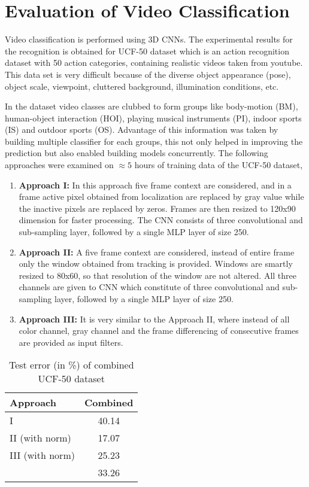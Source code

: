 \section{Evaluation of Video Classification} 
\label{sec:EvVS}
Video classification is performed using 3D CNNs.  The experimental results for the recognition is obtained for UCF-50 dataset which is an action recognition dataset with 50 action categories,	 containing realistic videos taken from youtube.  This data set is very difficult because of the diverse object appearance (pose), object scale, viewpoint, cluttered background, illumination conditions, etc.  
\par In the dataset video classes are clubbed to form groups like body-motion (BM), human-object interaction (HOI), playing musical instruments (PI), indoor sports (IS) and outdoor sports (OS).   Advantage of this information was taken by building multiple classifier for each groups, this not only helped in improving the prediction but also enabled building models concurrently. The following approaches were examined on $\approx{5}$ hours of training data of the UCF-50 dataset,
\begin{enumerate}
	\item{\textbf{Approach I:} In this approach five frame context are considered, and in a frame active pixel obtained from localization are replaced by gray value while the inactive pixels are replaced by zeros.  Frames are then resized to 120x90 dimension for faster processing.  The CNN consists of three convolutional and sub-sampling layer,  followed by a single MLP layer of size 250.}
	\item{\textbf{Approach II:} A five frame context are considered, instead of entire frame only the window obtained from tracking is provided.  Windows are smartly resized to 80x60, so that resolution of the window are not altered.  All three channels are given to CNN which constitute of three convolutional and sub-sampling layer,  followed by a single MLP layer of size 250.}
	\item{\textbf{Approach III:} It is very similar to the Approach II, where instead of all color channel, gray channel and the frame differencing of consecutive frames are provided as input filters.}	
\end{enumerate}
\begin{table}[htbp]
   \caption{Test error (in \%) of combined UCF-50 dataset}
   \begin{center}
   \begin{tabular}{|l|c|} \hline
        \textbf{Approach}&  \textbf{Combined} \\ \hline
        I & 40.14\\ \hline
		II (with norm) &  17.07 \\ \hline		 
		III (with norm) &  25.23 \\ \hline
		\cite{recognizing50} &  33.26 \\ \hline
   \end{tabular}
   \label{tab:comrecognition}
   \medskip \small 
   \end{center}
 \end{table} 
 
